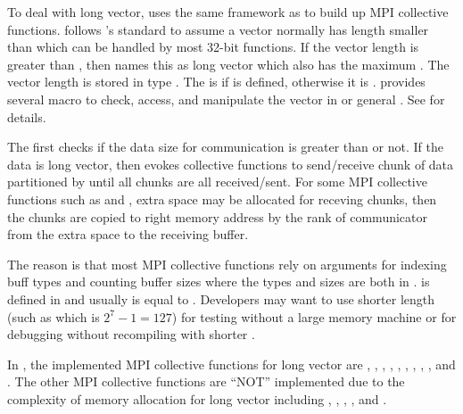 
To deal with long vector,
 uses the same framework as  to build up MPI
collective functions.  follows 's standard to
assume a vector normally has length smaller than 
which can be handled by most 32-bit functions. If the vector length
is greater than , then  names this as
long vector which also has the maximum . The vector length
is stored in type . The  is  if
 is defined, otherwise it is .
 provides several  macro to check, access, and
manipulate the vector in  or general .
See  for details.

The  first checks if the data size for
communication is greater than  or not.
If the data is long vector, then  evokes collective functions
to send/receive chunk of data partitioned by  until
all chunks are all received/sent.
For some MPI collective functions such as
 and , extra space may be allocated
for receving chunks, then the chunks are copied to right memory address
by the rank of communicator from the extra space to the receiving buffer.

The reason is that most MPI collective functions rely on arguments
for indexing buff types and counting buffer sizes where the types and sizes
are both in .
 is defined in  and
usually is equal to . Developers may want to
use shorter length (such as  which is $2^7 - 1 = 127$)
for testing without a large memory machine or
for debugging without recompiling  with shorter
.

In ,
the implemented MPI collective functions for long vector are
, ,
, , , ,
, , , and .
The other MPI collective functions are
``NOT'' implemented due to the complexity of memory allocation for long vector
including , , ,
, and .

